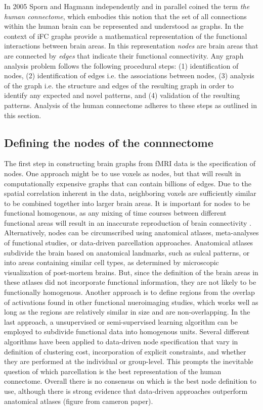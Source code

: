 In 2005 Sporn and Hagmann \cite{Sporns2005,Hagmann2005} independently and in parallel coined the term \textit{the human connectome}, which embodies this notion that the set of all connections within the human brain can be represented and understood as graphs. In the context of iFC graphs provide a mathematical representation of the functional interactions between brain areas. In this representation \emph{nodes} are brain areas that are connected by \emph{edges} that indicate their functional connectivity. Any graph analysis problem follows the following procedural steps: (1) identification of nodes, (2) identification of edges i.e. the associations between nodes, (3) analysis of the graph i.e. the structure and edges of the resulting graph in order to identify any expected and novel patterns, and (4) validation of the resulting patterns. Analysis of the human connectome adheres to these steps as outlined in this section. 

\subsection*{Defining the nodes of the connnectome}

The first step in constructing brain graphs from fMRI data is the specification of nodes. One approach might be to use voxels as nodes, but that will result in computationally expensive graphs that can contain billions of edges. Due to the spatial correlation inherent in the data, neighboring voxels are sufficiently similar to be combined together into larger brain areas. It is important for nodes to be functional homogenous, as any mixing of time courses between different functional areas will result in an inaccurate reproduction of brain connectivity \cite{smith2010}. Alternatively, nodes can be circumscribed using anatomical atlases, meta-analyses of functional studies, or data-driven parcellation approaches. Anatomical atlases subdivide the brain based on anatomical landmarks\cite{AAL, HO}, such as sulcal patterns\cite{varoquaux}, or into areas containing similar cell types, as determined by microscopic visualization of post-mortem brains\cite{TT,Eickhoff-zilles}. But, since the definition of the brain areas in these atlases did not incorporate functional information, they are not likely to be functionally homogenous. Another approach is to define regions from the overlap of activations found in other functional nueroimaging studies\cite{Dosenbach}, which works well as long as the regions are relatively similar in size and are non-overlapping\cite{VaroquauxCraddock2013}. In the last approach, a unsupervised or semi-supervised learning algorithm can be employed to subdivide functional data into homogenous units. Several different algorithms have been applied to data-driven node specification that vary in definition of clustering cost, incorporation of explicit constraints, and whether they are performed at the individual or group-level. This prompts the inevitable question of which parcellation is the best representation of the human connectome. Overall there is no consensus on which is the best node definition to use, although there is strong evidence that data-driven approaches outperform anatomical atlases (figure from cameron paper).

